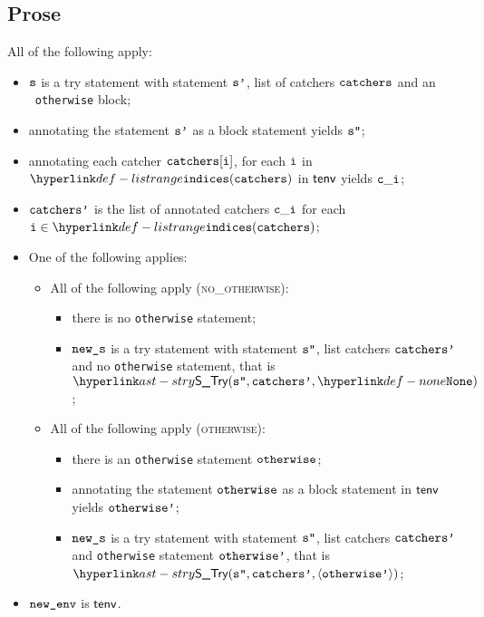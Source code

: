 \subsection{Prose}
All of the following apply:
\begin{itemize}
  \item $\texttt{s}$ is a try statement with statement $\texttt{s'}$, list of catchers $\texttt{catchers}$ and an \optional\ \texttt{otherwise} block;
  \item annotating the statement $\texttt{s'}$ as a block statement yields $\texttt{s''}$\ProseOrTypeError;
  \item annotating each catcher $\texttt{catchers}[\texttt{i}]$, for each $\texttt{i}$ in $\listrange(\catchers)$ in $\textsf{tenv}$ yields $\texttt{c}\_\texttt{i}$\ProseOrTypeError;
  \item $\texttt{catchers'}$ is the list of annotated catchers $\texttt{c}\_\texttt{i}$ for each $\vi\in\listrange(\catchers)$;
  \item One of the following applies:
  \begin{itemize}
    \item All of the following apply (\textsc{no\_otherwise}):
    \begin{itemize}
      \item there is no \texttt{otherwise} statement;
      \item $\texttt{new\_s}$ is a try statement with statement $\texttt{s''}$, list catchers $\texttt{catchers'}$ and no \texttt{otherwise} statement,
            that is \\
            $\STry(\vspp, \catchersp, \None)$;
    \end{itemize}

    \item All of the following apply (\textsc{otherwise}):
    \begin{itemize}
      \item there is an \texttt{otherwise} statement $\texttt{otherwise}$;
      \item annotating the statement $\texttt{otherwise}$ as a block statement in $\textsf{tenv}$ yields $\texttt{otherwise'}$\ProseOrTypeError;
      \item $\texttt{new\_s}$ is a try statement with statement $\texttt{s''}$, list catchers $\texttt{catchers'}$ and \texttt{otherwise} statement
            $\texttt{otherwise'}$, that is \\
            $\STry(\vspp, \catchersp, \langle\otherwisep\rangle)$;
    \end{itemize}
  \end{itemize}
  \item $\texttt{new\_env}$ is $\textsf{tenv}$.
\end{itemize}

